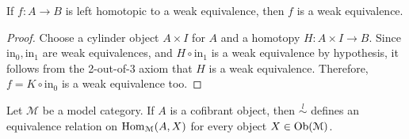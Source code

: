 \begin{refsection}
%

\begin{lemma} \label{lemma homotopy category 0}
If $f \colon A \to B$ is left homotopic to a weak equivalence, then $f$ is a weak equivalence.
\end{lemma}

\begin{proof}
Choose a cylinder object $A \times I$ for $A$ and a homotopy $H \colon A \times I \to B$. Since $\mathrm{in}_0, \mathrm{in}_1$ are weak equivalences, and $H \circ \mathrm{in}_1$ is a weak equivalence by hypothesis, it follows from the 2-out-of-3 axiom that $H$ is a weak equivalence. Therefore, $f = K \circ \mathrm{in}_0$ is a weak equivalence too.
\end{proof}

\begin{lemma} \label{lemma homotopy category 1}
Let $\mathcal M$ be a model category. If $A$ is a cofibrant object, then $\stackrel{l}{\sim}$ defines an equivalence relation on $\mathrm{Hom}_{\mathcal M}(A,X)$ for every object $X \in \operatorname{Ob}(\mathcal M)$.
\end{lemma}



\end{refsection}
